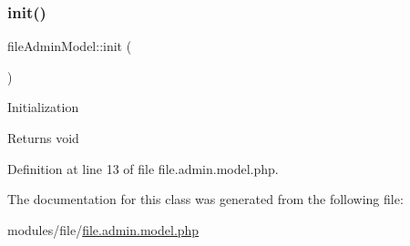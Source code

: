 \subsubsection{\texorpdfstring{init()}{init()}}
{\footnotesize\ttfamily file\+Admin\+Model\+::init (\begin{DoxyParamCaption}{ }\end{DoxyParamCaption})}

Initialization \begin{DoxyReturn}{Returns}
void 
\end{DoxyReturn}


Definition at line 13 of file file.\+admin.\+model.\+php.



The documentation for this class was generated from the following file\+:\begin{DoxyCompactItemize}
\item 
modules/file/\hyperlink{file_8admin_8model_8php}{file.\+admin.\+model.\+php}\end{DoxyCompactItemize}
